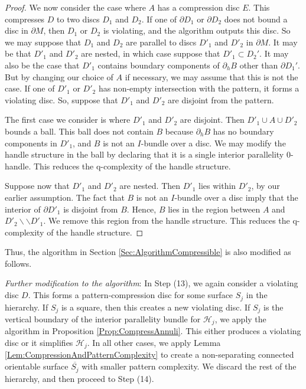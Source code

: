 \documentclass[oneside]{amsart}
\numberwithin{equation}{section}
\theoremstyle{plain}
\theoremstyle{definition}
\newcommand{\cut}{\backslash\backslash}
\begin{document}
\begin{proof}
We now consider the case where $A$ has a compression disc $E$. This compresses $D$ to two discs $D_1$ and $D_2$. If one of $\partial D_1$ or $\partial D_2$ does not bound a disc in $\partial M$, then $D_1$ or $D_2$ is violating, and the algorithm outputs this disc. So we may suppose that $D_1$ and $D_2$ are parallel to discs $D'_1$ and $D'_2$ in $\partial M$. It may be that $D'_1$ and $D'_2$ are nested, in which case suppose that $D'_1 \subset D_2'$. It may also be the case that $D'_1$ contains boundary components of $\partial_h B$ other than $\partial D_1'$. But by changing our choice of $A$ if necessary, we may assume that this is not the case.
If one of $D'_1$ or $D'_2$ has non-empty intersection with the pattern, it forms a violating disc. So, suppose that $D'_1$ and $D'_2$ are disjoint from the pattern.

The first case we consider is where $D'_1$ and $D'_2$ are disjoint. Then $D'_1 \cup A \cup D'_2$ bounds a ball. This ball does not contain $B$ because $\partial_h B$ has no boundary components in $D'_1$, and $B$ is not an $I$-bundle over a disc. We may modify the handle structure in the ball by declaring that it is a single interior parallelity 0-handle. This reduces the q-complexity of the handle structure.

Suppose now that $D'_1$ and $D'_2$ are nested. Then $D'_1$ lies within $D'_2$, by our earlier assumption. The fact that $B$ is not an $I$-bundle over a disc imply that the interior of $\partial D'_1$ is disjoint from $B$. Hence, $B$ lies in the region between $A$ and $D'_2 \cut D'_1$. We remove this region from the handle structure. This reduces the q-complexity of the handle structure.
\end{proof}

Thus, the algorithm in Section \ref{Sec:AlgorithmCompressible} is also modified as follows. 

\medskip
\noindent \emph{Further modification to the algorithm}:
In Step (13), we again consider a violating disc $D$. This forms a pattern-compression disc for some surface $S_j$ in the hierarchy. If $S_j$ is a square, then this creates a new violating disc. If $S_j$ is the vertical boundary of the interior parallelity bundle for $\mathcal{H}_j$, we apply the algorithm in Proposition \ref{Prop:CompressAnnuli}. This either produces a violating disc or it simplifies $\mathcal{H}_j$. In all other cases, we apply Lemma \ref{Lem:CompressionAndPatternComplexity} to create a non-separating connected orientable surface $\overline{S_j}$ with smaller pattern complexity. We discard the rest of the hierarchy, and then proceed to Step (14).
\end{document}
